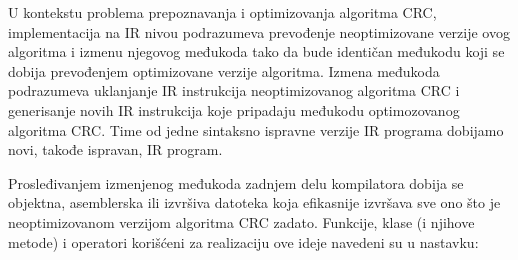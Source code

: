 \documentclass[12pt,oneside]{memoir}
\begin{document}
U kontekstu problema prepoznavanja i optimizovanja algoritma CRC, implementacija na IR nivou podrazumeva prevođenje neoptimizovane verzije ovog algoritma i izmenu njegovog međukoda tako da bude identičan međukodu koji se dobija prevođenjem optimizovane verzije algoritma. Izmena međukoda podrazumeva uklanjanje IR instrukcija neoptimizovanog algoritma CRC i generisanje novih IR instrukcija koje pripadaju međukodu
optimozovanog algoritma CRC. Time od jedne sintaksno ispravne verzije IR programa dobijamo novi, takođe ispravan, IR program. 

Prosleđivanjem izmenjenog međukoda zadnjem delu kompilatora dobija se objektna, asemblerska ili izvršiva datoteka koja efikasnije izvršava sve ono što je neoptimizovanom verzijom algoritma CRC zadato. Funkcije, klase (i njihove metode) i operatori korišćeni za realizaciju ove ideje navedeni su u nastavku:
\end{document}
